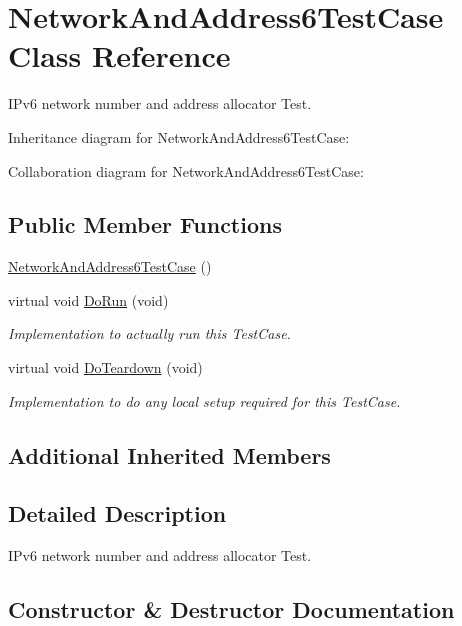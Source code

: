 \hypertarget{classNetworkAndAddress6TestCase}{}\section{Network\+And\+Address6\+Test\+Case Class Reference}
\label{classNetworkAndAddress6TestCase}


I\+Pv6 network number and address allocator Test.  




Inheritance diagram for Network\+And\+Address6\+Test\+Case\+:


Collaboration diagram for Network\+And\+Address6\+Test\+Case\+:
\subsection*{Public Member Functions}
\begin{DoxyCompactItemize}
\item 
\hyperlink{classNetworkAndAddress6TestCase_aab5097bee4e1f12013bfc49964f0c62f}{Network\+And\+Address6\+Test\+Case} ()
\item 
virtual void \hyperlink{classNetworkAndAddress6TestCase_aeda337d7e73e2555a63f3b500d68ae6a}{Do\+Run} (void)
\begin{DoxyCompactList}\small\item\em Implementation to actually run this Test\+Case. \end{DoxyCompactList}\item 
virtual void \hyperlink{classNetworkAndAddress6TestCase_af2753127f653141345a32a25950662ed}{Do\+Teardown} (void)
\begin{DoxyCompactList}\small\item\em Implementation to do any local setup required for this Test\+Case. \end{DoxyCompactList}\end{DoxyCompactItemize}
\subsection*{Additional Inherited Members}


\subsection{Detailed Description}
I\+Pv6 network number and address allocator Test. 

\subsection{Constructor \& Destructor Documentation}
